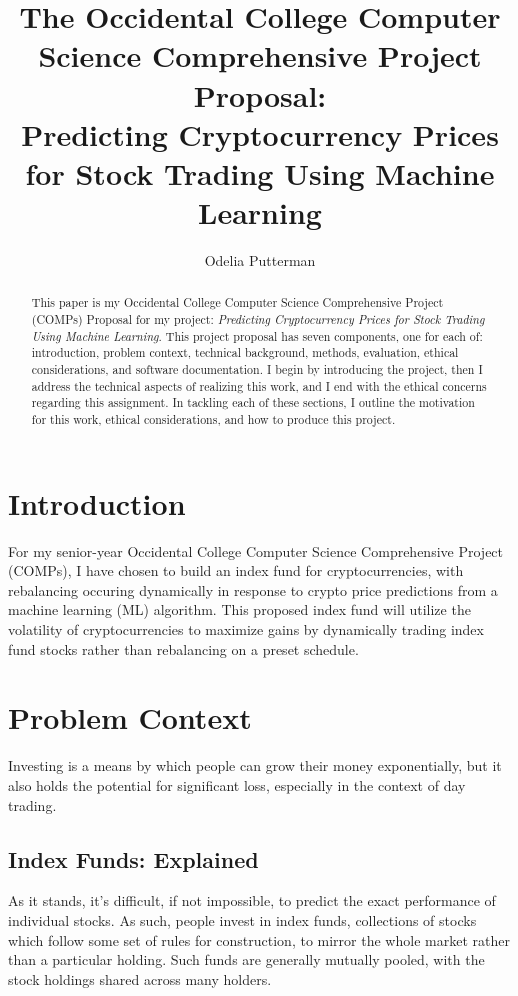 \documentclass[10pt,twocolumn]{article}
\title{The Occidental College Computer Science Comprehensive Project Proposal: \\ Predicting Cryptocurrency Prices for Stock Trading Using Machine Learning}
\author{Odelia Putterman}
\affiliation{Occidental College}
\begin{document}
\maketitle

\begin{abstract}
    This paper is my Occidental College Computer Science Comprehensive Project (COMPs) Proposal for my project: \textit{Predicting Cryptocurrency Prices for Stock Trading Using Machine Learning}. This project proposal has seven components, one for each of: introduction, problem context, technical background, methods, evaluation, ethical considerations, and software documentation.  I begin by introducing the project, then I address the technical aspects of realizing this work, and I end with the ethical concerns regarding this assignment. In tackling each of these sections, I outline the motivation for this work, ethical considerations, and how to produce this project.
\end{abstract}


\section{Introduction}

For my senior-year Occidental College Computer Science Comprehensive Project (COMPs), I have chosen to build an index fund for cryptocurrencies, with rebalancing occuring dynamically in response to crypto price predictions from a machine learning (ML) algorithm. This proposed index fund will utilize the volatility of cryptocurrencies to maximize gains by dynamically trading index fund stocks rather than rebalancing on a preset schedule.

\section{Problem Context}

Investing is a means by which people can grow their money exponentially, but it also holds the potential for significant loss, especially in the context of day trading.

\subsection{Index Funds: Explained}

As it stands, it's difficult, if not impossible, to predict the exact performance of individual stocks. As such, people invest in index funds, collections of stocks which follow some set of rules for construction, to mirror the whole market rather than a particular holding. Such funds are generally mutually pooled, with the stock holdings shared across many holders.
\end{document}
